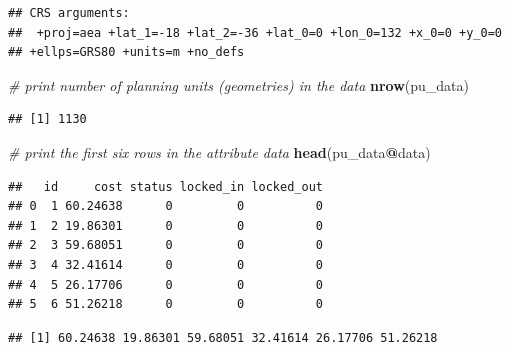 \documentclass[12pt,]{book}
\newenvironment{Shaded}{\begin{snugshade}}{\end{snugshade}}
\newcommand{\KeywordTok}[1]{\textcolor[rgb]{0.13,0.29,0.53}{\textbf{#1}}}
\newcommand{\CommentTok}[1]{\textcolor[rgb]{0.56,0.35,0.01}{\textit{#1}}}
\newcommand{\OperatorTok}[1]{\textcolor[rgb]{0.81,0.36,0.00}{\textbf{#1}}}
\newcommand{\NormalTok}[1]{#1}
\begin{document}
\begin{verbatim}
## CRS arguments:
##  +proj=aea +lat_1=-18 +lat_2=-36 +lat_0=0 +lon_0=132 +x_0=0 +y_0=0
## +ellps=GRS80 +units=m +no_defs
\end{verbatim}

\begin{Shaded}
\begin{Highlighting}[]
\CommentTok{# print number of planning units (geometries) in the data}
\KeywordTok{nrow}\NormalTok{(pu_data)}
\end{Highlighting}
\end{Shaded}

\begin{verbatim}
## [1] 1130
\end{verbatim}

\begin{Shaded}
\begin{Highlighting}[]
\CommentTok{# print the first six rows in the attribute data}
\KeywordTok{head}\NormalTok{(pu_data}\OperatorTok{@}\NormalTok{data)}
\end{Highlighting}
\end{Shaded}

\begin{verbatim}
##   id     cost status locked_in locked_out
## 0  1 60.24638      0         0          0
## 1  2 19.86301      0         0          0
## 2  3 59.68051      0         0          0
## 3  4 32.41614      0         0          0
## 4  5 26.17706      0         0          0
## 5  6 51.26218      0         0          0
\end{verbatim}

\begin{Shaded}
\end{Shaded}

\begin{verbatim}
## [1] 60.24638 19.86301 59.68051 32.41614 26.17706 51.26218
\end{verbatim}

\begin{Shaded}
\end{Shaded}
\end{document}
